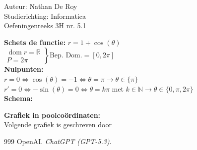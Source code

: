 \documentclass[a4paper]{article}
\begin{document}
\noindent \large Auteur: Nathan De Roy \\
\noindent \large Studierichting: Informatica\\
\noindent \large Oefeningenreeks 3H nr. 5.1\\

\medskip
\normalsize

\noindent \textbf{Schets de functie:} $r = 1 + \cos(\theta)$\\

$\left .
\begin{array}{l}
    \operatorname{dom} r    = \mathbb{R}\\
    P                       = 2\pi
\end{array}
\right \}
\text{Bep. Dom.} = [0, 2\pi]$\\

\noindent \textbf{Nulpunten:}\\

$r = 0 \Leftrightarrow \cos(\theta) = -1 \Leftrightarrow \theta = \pi \longrightarrow \theta \in \{\pi\}$\\

$r' = 0 \Leftrightarrow -\sin(\theta) = 0 \Leftrightarrow \theta = k\pi$ met $k \in \mathbb{N} \longrightarrow \theta \in \{ 0, \pi, 2\pi\}$\\

\noindent \textbf{Schema:}\\


\bigskip
\noindent \textbf{Grafiek in poolcoördinaten:}\\

\noindent Volgende grafiek is geschreven door \cite{a}\\

\begin{center}
\end{center}

\begin{thebibliography}{999}
 OpenAI. \textit{ChatGPT (GPT-5.3)}. 
\end{thebibliography}
\end{document}
